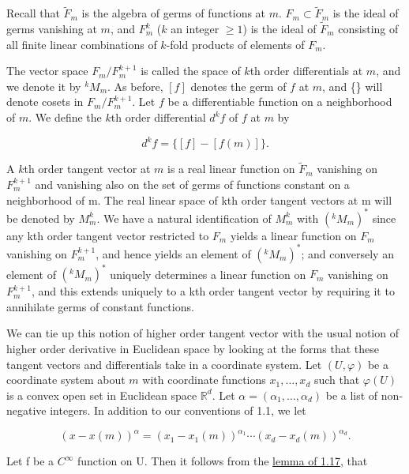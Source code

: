Recall that $\tilde{F}_{m}$ is the algebra of germs of functions at $m$. $F_{m} \subset \tilde{F}_{m}$ is the ideal of germs vanishing at $m$, and $F_{m}^{k}$ ($k$ an integer $\geq 1$) is the ideal of $\tilde{F}_{m}$ consisting of all finite linear combinations of $k$-fold products of elements of $F_{m}$.

The vector space $F_m/F_m^{k+1}$ is called the space of $k$th order differentials at $m$, and we denote it by ${}^kM_m$. As before, $[f]$ denotes the germ of $f$ at $m$, and \{\} will denote cosets in $F_m/F_m^{k+1}$. Let $f$ be a differentiable function on a neighborhood of $m$. We define the $k$th order differential $d^k f$ of $f$ at $m$ by

\begin{equation}
	\label{eq:1.26:1}
	d^{k}f=\{[f]-[f(m)]\}.
\end{equation}

A $k$th order tangent vector at $m$ is a real linear function on $\tilde{F}_{m}$ vanishing on $F_{m}^{k+1}$ and vanishing also on the set of germs of functions constant on a neighborhood of m. The real linear space of kth order tangent vectors at m will be denoted by  $ M_{m}^{k} $. We have a natural identification of  $ M_{m}^{k} $ with  $ ({}^kM_{m})^{*} $ since any kth order tangent vector restricted to  $ F_{m} $ yields a linear function on  $ F_{m} $ vanishing on  $ F_{m}^{k+1} $, and hence yields an element of  $ ({}^kM_{m})^{*} $; and conversely an element of  $ ({}^kM_{m})^{*} $ uniquely determines a linear function on  $ F_{m} $ vanishing on  $ F_{m}^{k+1} $, and this extends uniquely to a kth order tangent vector by requiring it to annihilate germs of constant functions.

We can tie up this notion of higher order tangent vector with the usual notion of higher order derivative in Euclidean space by looking at the forms that these tangent vectors and differentials take in a coordinate system. Let  $ (U,\varphi) $ be a coordinate system about  $ m $ with coordinate functions  $ x_1, \ldots, x_d $ such that  $ \varphi(U) $ is a convex open set in Euclidean space  $ \mathbb{R}^d $. Let  $ \alpha = (\alpha_1, \ldots, \alpha_d) $ be a list of non-negative integers. In addition to our conventions of 1.1, we let

\[
	(x-x(m))^{\alpha}=(x_{1}-x_{1}(m))^{\alpha_{1}}\cdots(x_{d}-x_{d}(m))^{\alpha_{d}}.
\]

Let f be a  $ C^{\infty} $ function on U. Then it follows from the \hyperref[thm:1.17]{lemma of 1.17}, that

